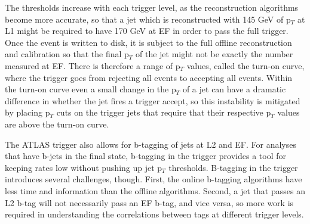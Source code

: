 The thresholds increase with each trigger level, as the reconstruction algorithms become more accurate, so that a jet which is reconstructed with 145 GeV of p$_T$ at L1 might be required to have 170 GeV at EF in order to pass the full trigger.  Once the event is written to disk, it is subject to the full offline reconstruction and calibration so that the final p$_T$ of the jet might not be exactly the number measured at EF.  There is therefore a range of p$_T$ values, called the turn-on curve, where the trigger goes from rejecting all events to accepting all events.  Within the turn-on curve even a small change in the p$_T$ of a jet can have a dramatic difference in whether the jet fires a trigger accept, so this instability is mitigated by placing p$_T$ cuts on the trigger jets that require that their respective p$_T$ values are above the turn-on curve.  

The ATLAS trigger also allows for b-tagging of jets at L2 and EF.  For analyses that have b-jets in the final state, b-tagging in the trigger provides a tool for keeping rates low without pushing up jet p$_T$ thresholds.  B-tagging in the trigger introduces several challenges, though.  First, the online b-tagging algorithms have less time and information than the offline algorithms.  Second, a jet that passes an L2 b-tag will not necessarily pass an EF b-tag, and vice versa, so more work is required in understanding the correlations between tags at different trigger levels.  







